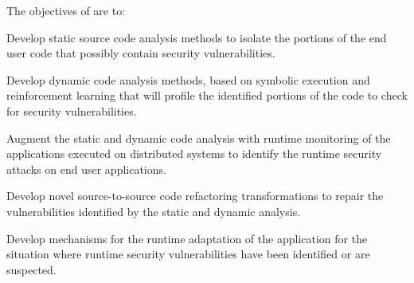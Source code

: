 \addtocounter{wpno}{1}
\begin{Workpackage}{\thewpno}
\WPTitle{\wpname{\thewpno}}

	

\begin{WPObjectives}
The objectives of \theWP{} are to:
\begin{compactitem}
\item Develop static source code analysis methods to isolate the portions of the end user code that possibly contain security vulnerabilities.
\item Develop dynamic code analysis methods, based on symbolic execution and reinforcement learning that will profile the identified portions of the code to check for security vulnerabilities.
\item Augment the static and dynamic code analysis with runtime monitoring of the applications executed on distributed systems to identify the runtime security attacks on end user applications.
\item Develop novel source-to-source code refactoring transformations to repair the vulnerabilities identified by the static and dynamic analysis.
\item Develop mechanisms for the runtime adaptation of the application for the situation where runtime security vulnerabilities have been identified or are suspected.
\end{compactitem}
\end{WPObjectives}


\end{Workpackage}
